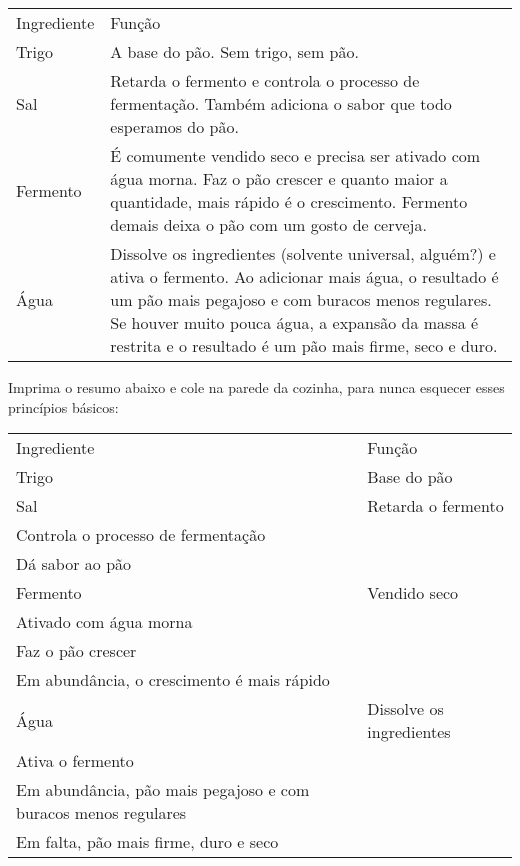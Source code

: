 \documentclass[a4paper,oneside]{article}
\begin{document}
\begin{center}
  \begin{tabular}{lp{}}
      Ingrediente & Função\\[5pt]
      Trigo       & A base do pão. Sem trigo, sem pão.\\
      Sal         & Retarda o fermento e controla o processo de fermentação.
                      Também adiciona o sabor que todo esperamos do pão.\\
      Fermento    & É comumente vendido seco e precisa ser ativado com água
                      morna.  Faz o pão crescer e quanto maior a quantidade,
                      mais rápido é o crescimento. Fermento demais deixa o pão
                      com um gosto de cerveja.\\
      Água        & Dissolve os ingredientes (solvente universal, alguém?) e
                      ativa o fermento. Ao adicionar mais água, o resultado é
                      um pão mais pegajoso e com buracos menos regulares. Se
                      houver muito pouca água, a expansão da massa é restrita e
                      o resultado é um pão mais firme, seco e duro.
  \end{tabular}
\end{center}

Imprima o resumo abaixo e cole na parede da cozinha, para nunca esquecer esses
princípios básicos:

%
\begin{center}
  \begin{tabular}{lp{}}
    Ingrediente & Função\tabularnewline[8pt]
    Trigo       & Base do pão\tabularnewline[3pt]
    Sal         & \raggedright Retarda o fermento\\
                    Controla o processo de fermentação\\
                    Dá sabor ao pão\tabularnewline[3pt]
    Fermento    & \raggedright Vendido seco\\
                    Ativado com água morna\\
                    Faz o pão crescer\\
                    Em abundância, o crescimento é mais
                    rápido\tabularnewline[3pt]
    Água        & \raggedright Dissolve os ingredientes\\
                    Ativa o fermento\\
                    Em abundância, pão mais pegajoso e com buracos menos
                    regulares\\
                    Em falta, pão mais firme, duro e seco
  \end{tabular}
\end{center}
\end{document}
